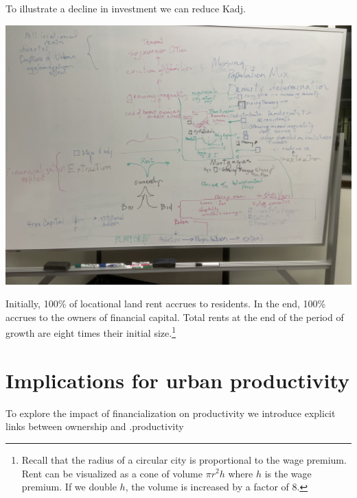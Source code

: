 



To illustrate a decline in investment we can reduce Kadj.

\includegraphics[scale=.5]{fig/IMG_2693.jpg}



Initially, 100\% of locational land rent accrues to residents. In the end, 100\% accrues to the owners of financial capital. Total rents at the end of the period of growth are eight times their initial size.\footnote{Recall that the radius of a circular city is proportional to the wage premium. Rent can be visualized as a cone of volume $\pi r^2 h$ where $h$ is the wage premium. If we double $h$, the volume is increased by a factor of 8.}



 \section{Implications for urban productivity}

 To explore the impact of financialization on productivity we introduce explicit links between ownership and .productivity
